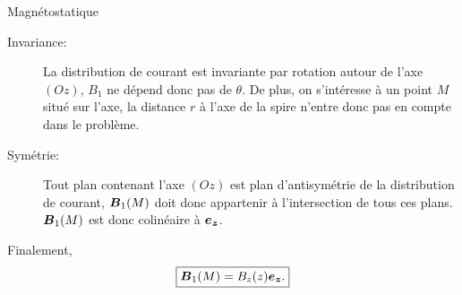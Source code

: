 \begin{corr}{Magnétostatique}
\begin{corrlist}
		      \begin{description}
			     \item[Invariance:] La distribution de courant est 
			     invariante par rotation autour de l'axe $(Oz)$, 
			     $B_1$ ne dépend donc pas de $\theta$. De plus, on 
			     s'intéresse à un point $M$ situé sur l'axe, la
			     distance $r$ à l'axe de la spire n'entre donc pas
			     en compte dans le problème.
		     \item[Symétrie: ] Tout plan contenant l'axe $(Oz)$ est 
			               plan d'antisymétrie de la distribution de courant,
				       $\vecb_1(M)$ doit donc appartenir à l'intersection
				       de tous ces plans. $\vecb_1(M)$ est donc colinéaire
				       à $\ez$.
		     \end{description}
		     Finalement,
		     \begin{equation*}
			     \boxed{\vecb_1(M) = B_z(z) \ez.}
		     \end{equation*}
		

\end{corrlist}
\end{corr}
